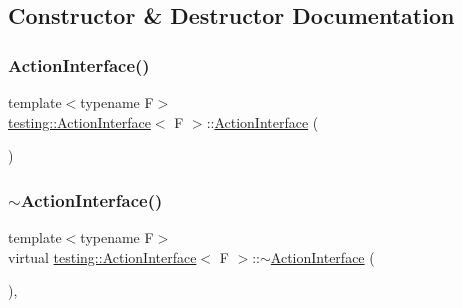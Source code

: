 \subsection{Constructor \& Destructor Documentation}
\mbox{\label{classtesting_1_1_action_interface_a0f1d44e4c669a9cae5ee5b28419a6f52}} 
\subsubsection{\texorpdfstring{ActionInterface()}{ActionInterface()}\hspace{0.1cm}{\footnotesize\ttfamily [1/3]}}
{\footnotesize\ttfamily template$<$typename F$>$ \\
\mbox{\hyperlink{classtesting_1_1_action_interface}{testing\+::\+Action\+Interface}}$<$ F $>$\+::\mbox{\hyperlink{classtesting_1_1_action_interface}{Action\+Interface}} (\begin{DoxyParamCaption}{ }\end{DoxyParamCaption})\hspace{0.3cm}{\ttfamily [inline]}}

\mbox{\label{classtesting_1_1_action_interface_a7dd0a5fc93d86ae3c9d04963b9f3a93f}} 
\subsubsection{\texorpdfstring{$\sim$ActionInterface()}{~ActionInterface()}\hspace{0.1cm}{\footnotesize\ttfamily [1/3]}}
{\footnotesize\ttfamily template$<$typename F$>$ \\
virtual \mbox{\hyperlink{classtesting_1_1_action_interface}{testing\+::\+Action\+Interface}}$<$ F $>$\+::$\sim$\mbox{\hyperlink{classtesting_1_1_action_interface}{Action\+Interface}} (\begin{DoxyParamCaption}{ }\end{DoxyParamCaption})\hspace{0.3cm}{\ttfamily [inline]}, {\ttfamily [virtual]}}

